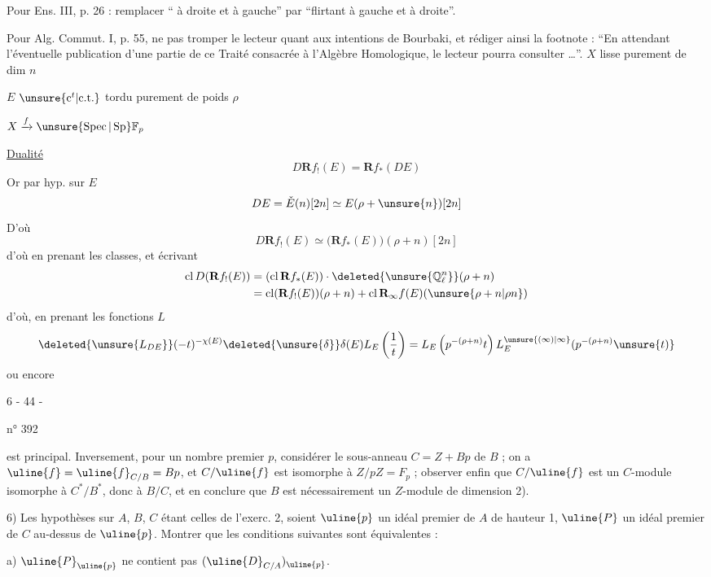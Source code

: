 Pour Ens. III, p. 26 : remplacer `` à droite et à gauche'' par ``flirtant à gauche et à droite''.

Pour Alg. Commut. I, p. 55, ne pas tromper le lecteur quant aux intentions de Bourbaki, et rédiger ainsi la footnote : ``En attendant l'éventuelle publication d'une partie de ce Traité consacrée à l'Algèbre Homologique, le lecteur pourra consulter \ldots{}''.
$X$ lisse purement de dim $n$

$E$ $\unsure{\mathrm c^t|\mathrm{c.t.}}$ tordu purement de poids $\rho$

$X\xrightarrow{f}\unsure{\operatorname{Spec}|\operatorname{Sp}}\mathbb F_p$ 

\uline{Dualité}
\[D\mathbf R f_!(E)=\mathbf R f_*(DE)\]
Or par hyp. sur $E$
\[DE=\check E(n)[2n]\simeq E(\rho+\unsure{n})[2n]\]
D'où
\[D\mathbf R f_!(E)\simeq\bigl(\mathbf R f_*(E)\bigr)(\rho+n)[2n]\]
d'où en prenant les classes, et écrivant
\[
\begin{aligned}
\operatorname{cl}D(\mathbf R f_!(E))&=(\operatorname{cl}\mathbf R f_*(E))\cdot\deleted{\unsure{\mathbb Q_\ell^n}}(\rho+n)\\
&=\operatorname{cl}(\mathbf R f_!(E))(\rho+n)+\operatorname{cl}\mathbf R_\infty f(E)(\unsure{\rho+n|\rho n})
\end{aligned}
\]
d'où, en prenant les fonctions $L$
\[
\deleted{\unsure{L_{DE}}}(-t)^{-\chi(E)}\deleted{\unsure{\delta}}\delta(E)L_E\left(\frac1t\right)=L_E\left(p^{-(\rho+n)}t\right)L_E^{\unsure{(\infty)|\infty}}(p^{-(\rho+n)}\unsure{t)}
\]
ou encore
\begin{center}6 - 44 -\end{center}
\hfill n° 392

est principal. Inversement, pour un nombre premier $p$, considérer le sous-anneau $C=Z+Bp$ de $B$ ; on a $\uline{f}=\uline{f}_{C/B}=Bp$, et $C/\uline{f}$ est isomorphe à $Z/pZ=F_p$ ; observer enfin que $C/\uline{f}$ est un $C$-module isomorphe à $C^*/B^*$, donc à $B/C$, et en conclure que $B$ est nécessairement un $Z$-module de dimension 2).

6) Les hypothèses sur $A$, $B$, $C$ étant celles de l'exerc. 2, soient $\uline{p}$ un idéal premier de $A$ de hauteur 1, $\uline{P}$ un idéal premier de $C$ au-dessus de $\uline{p}$. Montrer que les conditions suivantes sont équivalentes :

a) $\uline{P}_{\uline{p}}$ ne contient pas $(\uline{D}_{C/A})_{\uline{p}}$.

